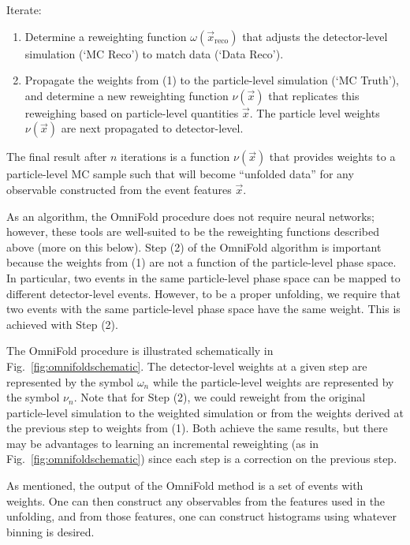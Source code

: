 \begin{description}
\item Iterate:
  \begin{enumerate}[label={(\arabic*)}]
    \item Determine a reweighting function $\omega(\vec{x}_\mathrm{reco})$ that adjusts the detector-level simulation (`MC Reco') to match data (`Data Reco').
    \item Propagate the weights from (1) to the particle-level simulation (`MC Truth'), and determine a new reweighting function $\nu(\vec{x})$ that replicates this reweighing based on particle-level quantities $\vec{x}$. The particle level weights $\nu(\vec{x})$ are next propagated to detector-level.
 \end{enumerate}
\end{description}
%
The final result after $n$ iterations is a function $\nu(\vec{x})$ that provides weights to a particle-level MC sample such that will become ``unfolded data'' for any observable constructed from the event features $\vec{x}$.

As an algorithm, the OmniFold procedure does not require neural networks; however, these tools are well-suited to be the reweighting functions described above (more on this below).  Step (2) of the OmniFold algorithm is important because the weights from (1) are not a function of the particle-level phase space.  In particular, two events in the same particle-level phase space can be mapped to different detector-level events.  However, to be a proper unfolding, we require that two events with the same particle-level phase space have the same weight.  This is achieved with Step (2).

The OmniFold procedure is illustrated schematically in Fig.~\ref{fig:omnifoldschematic}.  The detector-level weights at a given step are represented by the symbol $\omega_n$ while the particle-level weights are represented by the symbol $\nu_n$.  Note that for Step (2), we could reweight from the original particle-level simulation to the weighted simulation or from the weights derived at the previous step to weights from (1).  Both achieve the same results, but there may be advantages to learning an incremental reweighting (as in Fig.~\ref{fig:omnifoldschematic}) since each step is a correction on the previous step.

As mentioned, the output of the OmniFold method is a set of events with weights.  One can then construct any observables from the features used in the unfolding, and from those features, one can construct histograms using whatever binning is desired.

